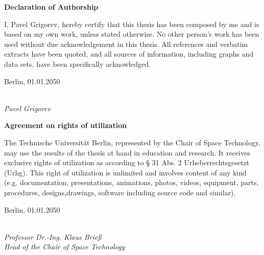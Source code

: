 \newpage

\thispagestyle{empty}

\begin{large}

\vspace*{1cm}

\centerline{\textbf{Declaration of Authorship}}
\vspace*{0.5cm}
\noindent
I, Pavel Grigorev, hereby certify that this thesis has been composed by me and is based on my own work, unless stated otherwise. No other person’s
work has been used without due acknowledgement in this thesis. All references and
verbatim extracts have been quoted, and all sources of information, including graphs
and data sets, have been specifically acknowledged.
\vspace{1cm}

\noindent
Berlin, 01.01.2050

\vspace{1cm}

\hspace*{7cm}%
\dotfill\\
\hspace*{7.5cm}%
\textit{Pavel Grigorev}

\vspace{4cm}
\centerline{\textbf{Agreement on rights of utilization}}
\vspace*{0.5cm}
\noindent
The Technische Universität Berlin, represented by the Chair of Space Technology,
may use the results of the thesis at hand in education and research. It receives exclusive rights of utilization as according to § 31 Abs. 2 Urheberrechtsgesetzt (Urhg).
This right of utilization is unlimited and involves content of any kind (e.g. documentation, presentations, animations, photos, videos, equipment, parts, procedures, designs,drawings, software including source code and similar).
\vspace{1cm}

\noindent
Berlin, 01.01.2050

\vspace{1cm}

\hspace*{7cm}%
\dotfill\\
\hspace*{7.5cm}%
\textit{Professor Dr.-Ing. Klaus Brieß}\\
\hspace*{7.5cm}%
\textit{Head of the Chair of Space Technology}

\end{large}
